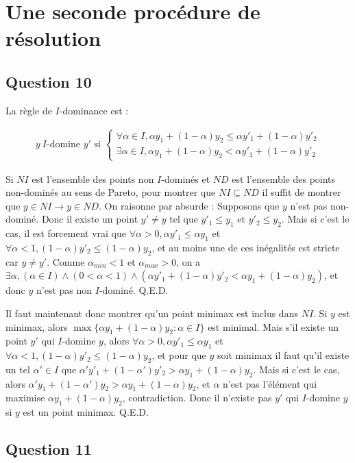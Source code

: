 \documentclass[paper=a4, fontsize=11pt]{scrartcl} %
\numberwithin{equation}{section} %
\numberwithin{figure}{section} %
\numberwithin{table}{section} %
\begin{document}
\section{Une seconde proc\'edure de r\'esolution}
\subsection{Question 10}
La r\`egle de $I$-dominance est :

\begin{align}
y\ I\text{-domine }y'\text{ si } \begin{cases} \forall\alpha\in I, \alpha y_1 + (1-\alpha)y_2 \leq \alpha y'_1 + (1-\alpha)y'_2 \\
\exists\alpha\in I, \alpha y_1 + (1-\alpha)y_2 < \alpha y'_1 + (1-\alpha)y'_2 \end{cases}
\end{align}

Si $NI$ est l'ensemble des points non $I$-domin\'es et $ND$ est l'ensemble des points non-domin\'es au sens de Pareto, pour montrer que $NI\subseteq ND$ il suffit de montrer que $y\in NI\rightarrow y\in ND$. On raisonne par absurde : Supposons que $y$ n'est pas non-domin\'e. Donc il existe un point $y' \neq y$ tel que $y'_1 \leq y_1$ et $y'_2 \leq y_2$. Mais si c'est le cas, il est forcement vrai que $\forall\alpha > 0, \alpha y'_1 \leq \alpha y_1$ et $\forall \alpha < 1, (1-\alpha)y'_2\leq(1-\alpha)y_2$, et au moins une de ces in\'egalit\'es est stricte car $y \neq y'$. Comme $\alpha_{min} <1$ et $\alpha_{max}>0$, on a $\exists\alpha, (\alpha\in I)\land (0 < \alpha < 1) \land (\alpha y'_1 + (1-\alpha)y'_2 < \alpha y_1 + (1-\alpha)y_2)$, et donc $y$ n'est pas non $I$-domin\'e. Q.E.D.

Il faut maintenant donc montrer qu'un point minimax est inclus dans $NI$. Si $y$ est minimax, alors $\max\{\alpha y_1 + (1-\alpha)y_2:\alpha\in I\}$ est minimal. Mais s'il existe un point $y'$ qui $I$-domine $y$, alors $\forall \alpha>0, \alpha y'_1 \leq \alpha y_1$ et $\forall \alpha < 1, (1-\alpha)y'_2 \leq (1-\alpha)y_2$, et pour que $y$ soit minimax il faut qu'il existe un tel $\alpha' \in I$ que $ \alpha' y'_1 + (1-\alpha')y'_2 >  \alpha y_1 + (1-\alpha)y_2$. Mais si c'est le cas, alors $ \alpha' y_1 + (1-\alpha')y_2 >  \alpha y_1 + (1-\alpha)y_2$, et $\alpha$ n'est pas l'\'el\'ement qui maximise $ \alpha y_1 + (1-\alpha)y_2$, contradiction. Donc il n'existe pas $y'$ qui $I$-domine $y$ si $y$ est un point minimax. Q.E.D.

\subsection{Question 11}
\end{document}
